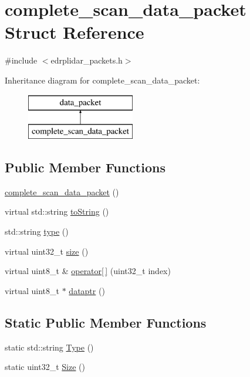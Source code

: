 \hypertarget{structcomplete__scan__data__packet}{\section{complete\-\_\-scan\-\_\-data\-\_\-packet Struct Reference}
\label{structcomplete__scan__data__packet}
}


{\ttfamily \#include $<$edrplidar\-\_\-packets.\-h$>$}

Inheritance diagram for complete\-\_\-scan\-\_\-data\-\_\-packet\-:\begin{figure}[H]
\begin{center}
\leavevmode
\includegraphics[height=2.000000cm]{structcomplete__scan__data__packet}
\end{center}
\end{figure}
\subsection*{Public Member Functions}
\begin{DoxyCompactItemize}
\item 
\hyperlink{structcomplete__scan__data__packet_a753b1906a3631b347472649120f748a4}{complete\-\_\-scan\-\_\-data\-\_\-packet} ()
\item 
virtual std\-::string \hyperlink{structcomplete__scan__data__packet_a35bfe3a588c176e844eea1c60453617e}{to\-String} ()
\item 
std\-::string \hyperlink{structcomplete__scan__data__packet_a144e017cea82952bda749de5692fdf6a}{type} ()
\item 
virtual uint32\-\_\-t \hyperlink{structcomplete__scan__data__packet_a2cc2871fdf24c03cd61f69acdec7cfb8}{size} ()
\item 
virtual uint8\-\_\-t \& \hyperlink{structcomplete__scan__data__packet_abcda1952cf162c478c0c0e1c77eaf34d}{operator\mbox{[}$\,$\mbox{]}} (uint32\-\_\-t index)
\item 
virtual uint8\-\_\-t $\ast$ \hyperlink{structcomplete__scan__data__packet_ad21ca3dc0a510662467edee56a02ae29}{dataptr} ()
\end{DoxyCompactItemize}
\subsection*{Static Public Member Functions}
\begin{DoxyCompactItemize}
\item 
static std\-::string \hyperlink{structcomplete__scan__data__packet_a1ecbf5f76b3b1f0b9938f8ab6ec7becf}{Type} ()
\item 
static uint32\-\_\-t \hyperlink{structcomplete__scan__data__packet_a45c7db37ae369581a70a6b2427489b22}{Size} ()
\end{DoxyCompactItemize}
